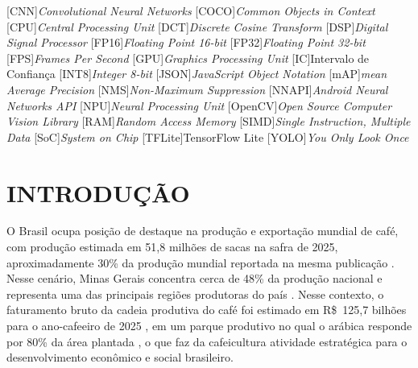 \documentclass[artigo,times,capa]{iftex2024}
\begin{document}

\maketitle

\begin{acronym}[OpenCV]
    [CNN]{\textit{Convolutional Neural Networks}}
    [COCO]{\textit{Common Objects in Context}}
    [CPU]{\textit{Central Processing Unit}}
    [DCT]{\textit{Discrete Cosine Transform}}
    [DSP]{\textit{Digital Signal Processor}}
    [FP16]{\textit{Floating Point 16-bit}}
    [FP32]{\textit{Floating Point 32-bit}}
    [FPS]{\textit{Frames Per Second}}
    [GPU]{\textit{Graphics Processing Unit}}
    [IC]{Intervalo de Confiança}
    [INT8]{\textit{Integer 8-bit}}
    [JSON]{\textit{JavaScript Object Notation}}
    [mAP]{\textit{mean Average Precision}}
    [NMS]{\textit{Non-Maximum Suppression}}
    [NNAPI]{\textit{Android Neural Networks API}}
    [NPU]{\textit{Neural Processing Unit}}
    [OpenCV]{\textit{Open Source Computer Vision Library}}
    [RAM]{\textit{Random Access Memory}}
    [SIMD]{\textit{Single Instruction, Multiple Data}}
    [SoC]{\textit{System on Chip}}
    [TFLite]{TensorFlow Lite}
    [YOLO]{\textit{You Only Look Once}}
\end{acronym}

\acresetall

\renewcommand{\arraystretch}{1.3}

\section{INTRODUÇÃO}
\label{sec:introducao}

O Brasil ocupa posição de destaque na produção e exportação mundial de
café, com produção estimada em 51,8 milhões de sacas na safra de 2025,
aproximadamente 30\% da produção mundial reportada na mesma publicação
\cite{CONAB2025}. Nesse cenário, Minas Gerais concentra cerca de 48\% da produção
nacional e representa uma das principais regiões produtoras do país
\cite{CONAB2025}. Nesse contexto, o faturamento bruto da cadeia produtiva do café foi
estimado em R\$~125,7 bilhões para o ano-cafeeiro de 2025
\cite{Cecafe2025}, em um parque produtivo no qual o arábica responde
por 80\% da área plantada \cite{MAPA2023}, o que faz da cafeicultura
atividade estratégica para o desenvolvimento econômico e social
brasileiro.
\end{document}

